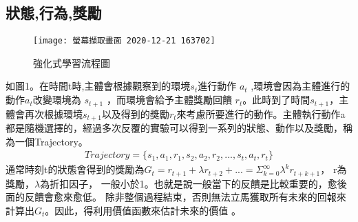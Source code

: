 \documentclass[a4paper,12pt]{article}
\begin{document}
\subsection{狀態,行為,獎勵}
\begin{figure*}[htb]
\hspace*{4.5cm}\texttt{[image: 螢幕擷取畫面 2020-12-21 163702]}
\caption{強化式學習流程圖}
\end{figure*}
\quad 如圖1。在時間t時,主體會根據觀察到的環境$s_{t}$進行動作 $a_{t}$ ,環境會因為主體進行的動作$a_{t}$改變環境為 $s_{t+1}$ ，而環境會給予主體獎勵回饋 $r_{t}$。此時到了時間$s_{t+1}$，主體會再次根據環境$s_{t+1}$以及得到的獎勵$r_{t}$來考慮所要進行的動作。主體執行動作a都是隨機選擇的，經過多次反覆的實驗可以得到一系列的狀態、動作以及獎勵，稱為一個Trajectory。
\begin{align}
Trajectory = \{s_{1},a_{1},r_{1},s_{2},a_{2},r_{2},... ,s_{t},a_{t},r_{t}\}\nonumber
\end{align}
\quad 通常時刻t的狀態會得到的獎勵為$G_{t} = r_{t+1}+\lambda r_{t+2}+...=\Sigma_{k=0}^{\infty}\lambda^{k}r_{t+k+1}$，
r為獎勵，$\lambda$為折扣因子， 一般小於1。也就是說一般當下的反饋是比較重要的，愈後面的反饋會愈來愈低。
除非整個過程結束，否則無法立馬獲取所有未來的回報來計算出$G_{t}$。因此，得利用價值函數來估計未來的價值 。\newline
\end{document}
